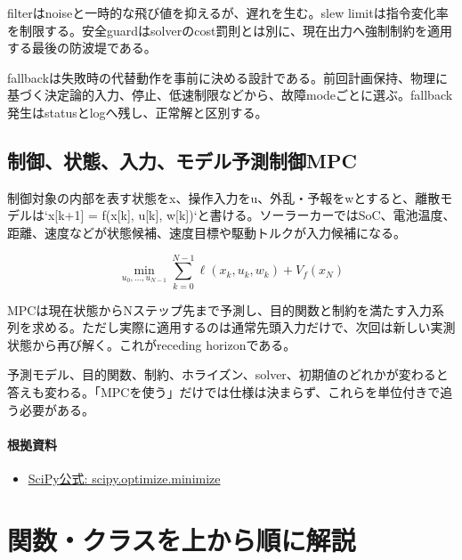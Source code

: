 \documentclass[a4paper,11pt]{article}
\begin{document}
filterはnoiseと一時的な飛び値を抑えるが、遅れを生む。slew limitは指令変化率を制限する。安全guardはsolverのcost罰則とは別に、現在出力へ強制制約を適用する最後の防波堤である。


fallbackは失敗時の代替動作を事前に決める設計である。前回計画保持、物理に基づく決定論的入力、停止、低速制限などから、故障modeごとに選ぶ。fallback発生はstatusとlogへ残し、正常解と区別する。



\subsection{制御、状態、入力、モデル予測制御MPC}
制御対象の内部を表す状態をx、操作入力をu、外乱・予報をwとすると、離散モデルは`x[k+1] = f(x[k], u[k], w[k])`と書ける。ソーラーカーではSoC、電池温度、距離、速度などが状態候補、速度目標や駆動トルクが入力候補になる。


\[
\min_{u_0,\ldots,u_{N-1}} \sum_{k=0}^{N-1}\ell(x_k,u_k,w_k)+V_f(x_N)
\]

MPCは現在状態からNステップ先まで予測し、目的関数と制約を満たす入力系列を求める。ただし実際に適用するのは通常先頭入力だけで、次回は新しい実測状態から再び解く。これがreceding horizonである。


予測モデル、目的関数、制約、ホライズン、solver、初期値のどれかが変わると答えも変わる。「MPCを使う」だけでは仕様は決まらず、これらを単位付きで追う必要がある。

\paragraph{根拠資料}
\begin{itemize}[leftmargin=1.6em]
\item \href{https://docs.scipy.org/doc/scipy/reference/generated/scipy.optimize.minimize.html}{SciPy公式: scipy.optimize.minimize}
\end{itemize}



        \section{関数・クラスを上から順に解説}
\end{document}

